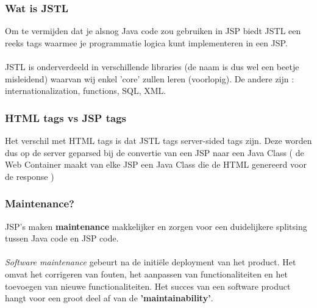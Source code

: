 \documentclass{beamer}
\begin{document}
\begin{frame}

\frametitle{Wat is JSTL}

Om te vermijden dat je alsnog Java code zou gebruiken in JSP biedt JSTL een
reeks tags waarmee je programmatie logica kunt implementeren in een JSP.\\~\\

JSTL is onderverdeeld in verschillende libraries (de naam is dus wel een beetje misleidend) waarvan wij enkel 'core' zullen leren (voorlopig). De andere zijn : internationalization, functions, SQL, XML.

\end{frame}


\begin{frame}

\frametitle{HTML tags vs JSP tags}

Het verschil met HTML tags is dat JSTL tags server-sided tags zijn. Deze worden dus op de server geparsed bij de convertie van een JSP naar een Java Class ( de Web Container maakt van elke JSP een Java Class die de HTML genereerd voor de response )

\end{frame}


\begin{frame}

\frametitle{Maintenance?}

JSP's maken \textbf{maintenance} makkelijker en zorgen voor een duidelijkere splitsing tussen
Java code en JSP code.\\~\\

\textit{Software maintenance} gebeurt na de initi\"ele deployment van het product.
Het omvat het corrigeren van fouten, het aanpassen van functionaliteiten en het 
toevoegen van nieuwe functionaliteiten. Het succes van een software product hangt
voor een groot deel af van de \textbf{'maintainability'}. 

\end{frame}
\end{document}
